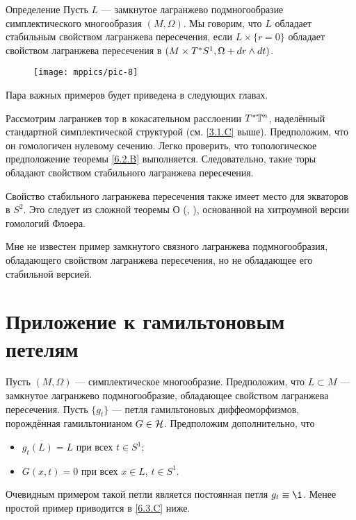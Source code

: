 \begin{ex}{Определение}\label{6.2.C}
Пусть $L$ --- замкнутое лагранжево подмногообразие симплектического многообразия $(M, \Omega)$.
Мы говорим, что $L$ обладает стабильным свойством лагранжева пересечения, если $L \times \{r = 0\}$ обладает свойством лагранжева пересечения в $(M \times T^\ast S^1, \Omega + d r \wedge d t)$.
\end{ex}


\begin{wrapfigure}{o}{25 mm}
\vskip-3mm
\centering
\texttt{[image: mppics/pic-8]}
\caption{}\label{pic-8}
\vskip0mm
\end{wrapfigure}


Пара важных примеров будет приведена в следующих главах.

\begin{thm}{}\label{6.2.D}
Рассмотрим лагранжев тор в кокасательном расслоении $T^\ast \mathbb{T}^n$, наделённый стандартной симплектической структурой (см. \ref{3.1.C} выше).
Предположим, что он гомологичен нулевому сечению.
Легко проверить, что топологическое предположение теоремы \ref{6.2.B} выполняется.
Следовательно, такие торы обладают свойством стабильного лагранжева пересечения.
\end{thm}




\begin{thm}[Экватор на $S^2$.]{}\label{6.2.E}
Свойство стабильного лагранжева пересечения также имеет место для экваторов в $S^2$.
Это следует из сложной теоремы О (\cite{O1}, \cite{O2}), основанной на хитроумной версии гомологий Флоера.
\end{thm}


Мне не известен пример замкнутого связного лагранжева подмногообразия, обладающего свойством лагранжева пересечения, но не обладающее его стабильной версией.


\section{Приложение к гамильтоновым петелям}

Пусть $(M, \Omega)$ --- симплектическое многообразие.
Предположим, что $L \subset M$ --- замкнутое лагранжево
подмногообразие, обладающее свойством 
лагранжева пересечения.  
Пусть $\{g_t\}$ --- петля гамильтоновых диффеоморфизмов, порождённая
гамильтонианом $G \in \mathcal{H}$. 
Предположим дополнительно, что
\begin{itemize}
\item $g_t (L) = L$ при всех $t \in S^1$; 
\item $G (x, t) = 0$ при всех $x \in L$, $t \in S^1$.
\end{itemize}
Очевидным примером такой петли является постоянная петля $g_t \z\equiv \1$.
Менее простой пример приводится в \ref{6.3.C} ниже.

